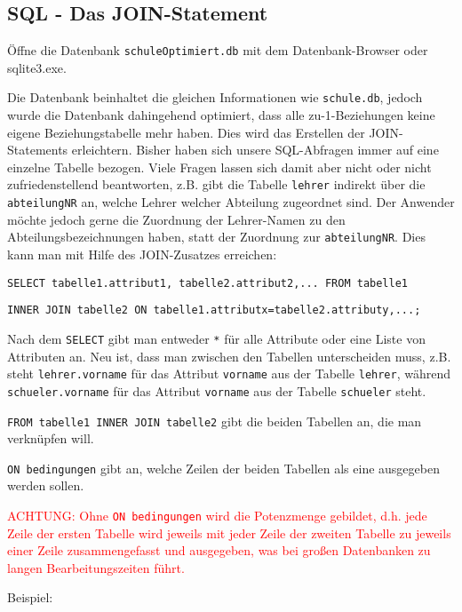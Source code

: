 \subsection[JOIN-Statement]{SQL - Das JOIN-Statement}\label{join}
Öffne die Datenbank \texttt{schuleOptimiert.db} mit dem Datenbank-Browser oder sqlite3.exe.

Die Datenbank beinhaltet die gleichen Informationen wie \texttt{schule.db}, jedoch wurde die Datenbank dahingehend optimiert, dass alle zu-1-Beziehungen keine eigene Beziehungstabelle mehr haben. Dies wird das Erstellen der JOIN-Statements erleichtern.
Bisher haben sich unsere SQL-Abfragen immer auf eine einzelne Tabelle bezogen. Viele Fragen lassen sich damit aber nicht oder nicht zufriedenstellend beantworten, z.B. gibt die Tabelle \lstinline!lehrer! indirekt über die \lstinline!abteilungNR! an, welche Lehrer welcher Abteilung zugeordnet sind. Der Anwender möchte jedoch gerne die Zuordnung der Lehrer-Namen zu den Abteilungsbezeichnungen haben, statt der Zuordnung zur \lstinline!abteilungNR!. Dies kann man mit Hilfe des JOIN-Zusatzes erreichen:
\begin{tcolorbox}[title=JOIN-Statement]
	\lstinline!SELECT tabelle1.attribut1, tabelle2.attribut2,... FROM tabelle1!

	\lstinline!INNER JOIN tabelle2 ON tabelle1.attributx=tabelle2.attributy,...;!
\end{tcolorbox}
Nach dem \lstinline!SELECT! gibt man entweder \lstinline!*! für alle Attribute oder  eine Liste von Attributen an. Neu ist, dass man zwischen den Tabellen unterscheiden muss, z.B. steht \lstinline!lehrer.vorname! für das Attribut \lstinline!vorname! aus der Tabelle \lstinline!lehrer!, während \lstinline!schueler.vorname! für das Attribut \lstinline!vorname! aus der Tabelle \lstinline!schueler! steht.

\lstinline!FROM tabelle1 INNER JOIN tabelle2! gibt die beiden Tabellen an, die man verknüpfen will.

\lstinline!ON bedingungen! gibt an, welche Zeilen der beiden Tabellen als eine ausgegeben werden sollen.

\textcolor{red}{ACHTUNG: Ohne \lstinline!ON bedingungen! wird die Potenzmenge gebildet, d.h. jede Zeile der ersten Tabelle wird jeweils mit jeder Zeile der zweiten Tabelle zu jeweils einer Zeile zusammengefasst und ausgegeben, was bei großen Datenbanken zu langen Bearbeitungszeiten führt.}

Beispiel:

